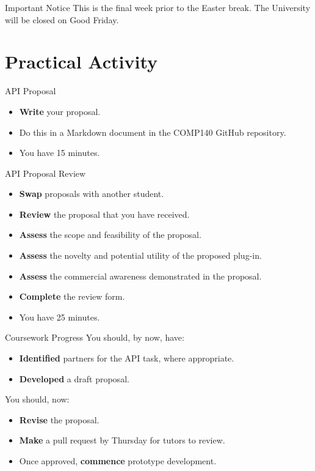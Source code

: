 \documentclass[xcolor={dvipsnames}]{beamer}\usepackage{etoolbox}\newtoggle{printable}\togglefalse{printable}
\begin{document}
\begin{frame}{Important Notice}
	This is the final week prior to the Easter break. The University will be closed on Good Friday.
\end{frame}





%

\part{Practical Activity}
\frame{\partpage}

\begin{frame}{API Proposal}
	\begin{itemize}
		\item \textbf{Write} your proposal.
		\item Do this in a Markdown document in the COMP140 GitHub repository.
		\item You have 15 minutes.
	\end{itemize}
\end{frame}
		
\begin{frame}{API Proposal Review}
	\begin{itemize}	
		\item \textbf{Swap} proposals with another student.	
		\item \textbf{Review} the proposal that you have received.
		\item \textbf{Assess} the scope and feasibility of the proposal.
		\item \textbf{Assess} the novelty and potential utility of the proposed plug-in.
		\item \textbf{Assess} the commercial awareness demonstrated in the proposal.
		\item \textbf{Complete} the review form.
		\vspace{2ex}
		\item You have 25 minutes.
	\end{itemize}
\end{frame}

\begin{frame}{Coursework Progress}
You should, by now, have:

	\begin{itemize}
		\item \textbf{Identified} partners for the API task, where appropriate.
		\item \textbf{Developed} a draft proposal. 
	\end{itemize}
	
You should, now:

	\begin{itemize}
		\item \textbf{Revise} the proposal.
		\item \textbf{Make} a pull request by Thursday for tutors to review. 
		\item Once approved, \textbf{commence} prototype development. 
	\end{itemize}
\end{frame}
\end{document}
